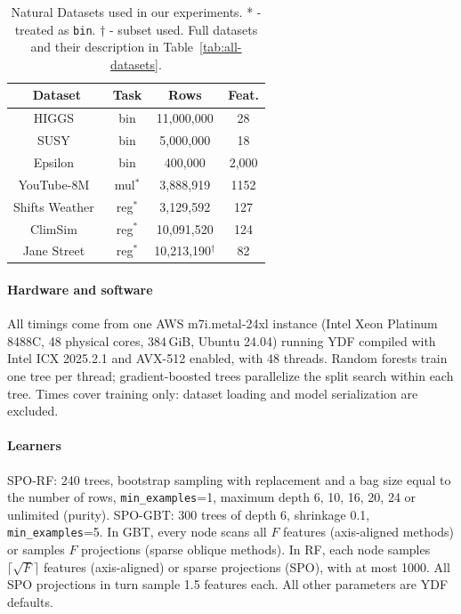 \documentclass[sigconf]{acmart}%
\newcommand{\code}[1]{\texttt{\small #1}}
\begin{document}
\begin{table}[t]
    \centering
    \begin{tabular}{c|c|c|c}
Dataset & Task & Rows & Feat. \\
\midrule
HIGGS~\cite{higgs_280} & bin & 11,000,000 & 28 \\
SUSY~\cite{susy_279} & bin & 5,000,000 & 18 \\
Epsilon~\cite{chang2011libsvm} & bin & 400,000 & 2,000 \\
YouTube-8M~\cite{abu2016youtube}         & mul$^*$   & 3,888,919            & 1152 \\
Shifts Weather~\cite{malinin2021shifts}   & reg$^*$   & 3,129,592            & 127 \\
ClimSim~\cite{yu2023climsim}              & reg$^*$   & 10,091,520           & 124 \\
Jane Street~\cite{jane-street-real-time-market-data-forecasting}       & reg$^*$   & 10,213,190$^\dagger$ & 82
\end{tabular}
\caption{Natural Datasets used in our experiments. * - treated as \texttt{bin}. $\dagger$ - subset used. Full datasets and their description in Table~\ref{tab:all-datasets}.}
\label{tab:natural-datasets}
\end{table}

\paragraph{Hardware and software} All timings come from one AWS m7i.metal-24xl instance (Intel Xeon Platinum 8488C, 48 physical cores, 384\,GiB, Ubuntu 24.04) running YDF compiled with Intel ICX 2025.2.1 and AVX-512 enabled, with 48 threads. Random forests train one tree per thread; gradient-boosted trees parallelize the split search within each tree. Times cover training only: dataset loading and model serialization are excluded.

\paragraph{Learners} SPO-RF: 240 trees, bootstrap sampling with replacement and a bag size equal to the number of rows, \code{min\_examples}=1, maximum depth 6, 10, 16, 20, 24 or unlimited (purity). SPO-GBT: 300 trees of depth 6, shrinkage 0.1, \code{min\_examples}=5. In GBT, every node scans all $F$ features (axis-aligned methods) or samples $F$ projections (sparse oblique methods). In RF, each node samples $\lceil\sqrt{F}\rceil$ features (axis-aligned) or sparse projections (SPO), with at most 1000. All SPO projections in turn sample 1.5 features each. All other parameters are YDF defaults.
\end{document}

